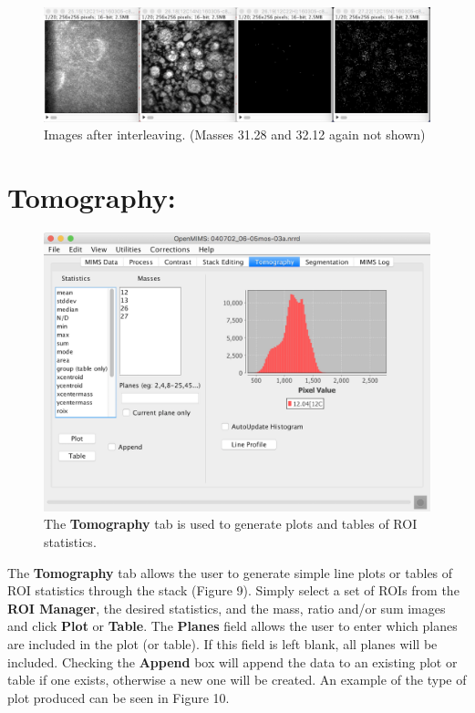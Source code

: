 \documentclass{article}
\begin{document}
	\begin{figure}[ht]
	\centering
	\includegraphics[scale=0.68]{snapshotPeakSwitch2.png}
	\caption{Images after interleaving.   (Masses 31.28 and 32.12 again not shown)}
	\end{figure}



\newpage
\section*{Tomography:}
	
	\begin{figure}[ht]
	\centering
	\includegraphics[scale=0.68]{snapshot_MimsTomography.png}
	\caption{The \textbf{Tomography} tab is used to generate plots and tables of ROI statistics.}
	\end{figure}
	
	The \textbf{Tomography} tab allows the user to generate simple line plots or tables
	of ROI statistics through the stack (Figure 9). Simply select a set of ROIs from the 
	\textbf{ROI Manager}, the desired statistics, and the mass, ratio and/or sum  
	images and click \textbf{Plot} or \textbf{Table}.
	The \textbf{Planes} field allows the user to enter which planes are 
	included in the plot (or table). If this field is left blank, all planes will be 
	included. Checking the \textbf{Append} box will append the data to an existing
	plot or table if one exists, otherwise a new one will be created. An example of 
	the type of plot produced can be seen in Figure 10. 
	
\end{document}
